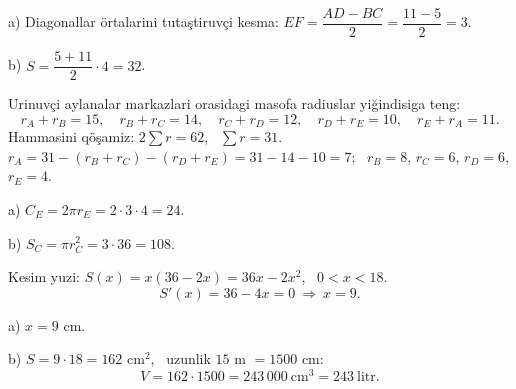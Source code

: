 a) Diagonallar örtalarini tutaştiruvçi kesma: $EF=\dfrac{AD-BC}2=\dfrac{11-5}2=3$.

b) $S=\dfrac{5+11}2\cdot4=32$.

\newpage
{}
Urinuvçi aylanalar markazlari orasidagi masofa radiuslar yiğindisiga teng:
\[r_A+r_B=15,\quad r_B+r_C=14,\quad r_C+r_D=12,\quad r_D+r_E=10,\quad r_E+r_A=11.\]
Hammasini qöşamiz: $2\sum r=62$, \ $\sum r=31$.\\
$r_A=31-(r_B+r_C)-(r_D+r_E)=31-14-10=7$; \ $r_B=8$, $r_C=6$, $r_D=6$, $r_E=4$.

a) $C_E=2\pi r_E=2\cdot3\cdot4=24$.

b) $S_C=\pi r_C^2=3\cdot36=108$.

\newpage
{}
Kesim yuzi: $S(x)=x(36-2x)=36x-2x^2$, \ $0<x<18$.
\[S'(x)=36-4x=0\ \Rightarrow\ x=9.\]

a) $x=9$ cm.

b) $S=9\cdot18=162$ cm$^2$, \ uzunlik $15$ m $=1500$ cm:
\[V=162\cdot1500=243\,000\ \text{cm}^3=243\ \text{litr}.\]

\ShowJavoblar

